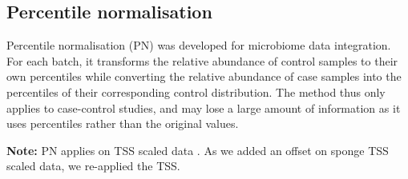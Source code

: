 \documentclass[]{book}
\newenvironment{Shaded}{\begin{snugshade}}{\end{snugshade}}
\newcommand{\KeywordTok}[1]{\textcolor[rgb]{0.13,0.29,0.53}{\textbf{#1}}}
\newcommand{\DataTypeTok}[1]{\textcolor[rgb]{0.13,0.29,0.53}{#1}}
\newcommand{\StringTok}[1]{\textcolor[rgb]{0.31,0.60,0.02}{#1}}
\newcommand{\CommentTok}[1]{\textcolor[rgb]{0.56,0.35,0.01}{\textit{#1}}}
\newcommand{\OperatorTok}[1]{\textcolor[rgb]{0.81,0.36,0.00}{\textbf{#1}}}
\newcommand{\NormalTok}[1]{#1}
\begin{document}
\begin{Shaded}
\end{Shaded}

\subsection{Percentile normalisation}\label{percentile-normalisation}

Percentile normalisation (PN) was developed for microbiome data
integration. For each batch, it transforms the relative abundance of
control samples to their own percentiles while converting the relative
abundance of case samples into the percentiles of their corresponding
control distribution. The method thus only applies to case-control
studies, and may lose a large amount of information as it uses
percentiles rather than the original values.

\textbf{Note:} PN applies on TSS scaled data
\citep{gibbons2018correcting}. As we added an offset on sponge TSS
scaled data, we re-applied the TSS.
\end{document}
